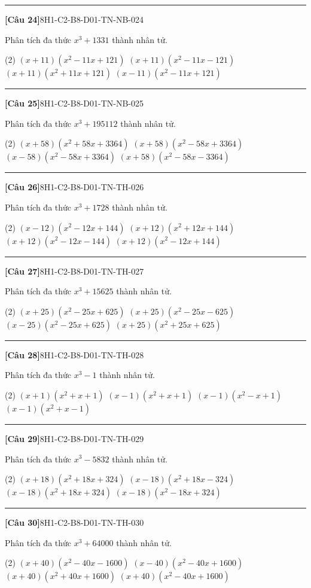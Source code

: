 \documentclass[12pt,a4paper]{article}
\newif\ifloigiai
\newenvironment{cauhoi}[2]{%
  \par\medskip\noindent\rule{\textwidth}{0.4pt}\par\nopagebreak
  \noindent\textbf{[#1]}\hfill{\scriptsize\ttfamily #2}\par\nopagebreak\smallskip}{\par}
\newcommand{\dapan}[1]{\ifloigiai\par\smallskip\noindent\textit{Đáp án:} \textbf{#1}\par\fi}
\begin{document}
\begin{cauhoi}{Câu 24}{8H1-C2-B8-D01-TN-NB-024}
Phân tích đa thức $x^{3}+1331$ thành nhân tử.
\begin{tasks}(2)
\task $(x+11)(x^{2}-11x+121)$
\task $(x+11)(x^{2}-11x-121)$
\task $(x+11)(x^{2}+11x+121)$
\task $(x-11)(x^{2}-11x+121)$
\end{tasks}
\dapan{A}
\end{cauhoi}
\begin{cauhoi}{Câu 25}{8H1-C2-B8-D01-TN-NB-025}
Phân tích đa thức $x^{3}+195112$ thành nhân tử.
\begin{tasks}(2)
\task $(x+58)(x^{2}+58x+3364)$
\task $(x+58)(x^{2}-58x+3364)$
\task $(x-58)(x^{2}-58x+3364)$
\task $(x+58)(x^{2}-58x-3364)$
\end{tasks}
\dapan{B}
\end{cauhoi}
\begin{cauhoi}{Câu 26}{8H1-C2-B8-D01-TN-TH-026}
Phân tích đa thức $x^{3}+1728$ thành nhân tử.
\begin{tasks}(2)
\task $(x-12)(x^{2}-12x+144)$
\task $(x+12)(x^{2}+12x+144)$
\task $(x+12)(x^{2}-12x-144)$
\task $(x+12)(x^{2}-12x+144)$
\end{tasks}
\dapan{D}
\end{cauhoi}
\begin{cauhoi}{Câu 27}{8H1-C2-B8-D01-TN-TH-027}
Phân tích đa thức $x^{3}+15625$ thành nhân tử.
\begin{tasks}(2)
\task $(x+25)(x^{2}-25x+625)$
\task $(x+25)(x^{2}-25x-625)$
\task $(x-25)(x^{2}-25x+625)$
\task $(x+25)(x^{2}+25x+625)$
\end{tasks}
\dapan{A}
\end{cauhoi}
\begin{cauhoi}{Câu 28}{8H1-C2-B8-D01-TN-TH-028}
Phân tích đa thức $x^{3}-1$ thành nhân tử.
\begin{tasks}(2)
\task $(x+1)(x^{2}+x+1)$
\task $(x-1)(x^{2}+x+1)$
\task $(x-1)(x^{2}-x+1)$
\task $(x-1)(x^{2}+x-1)$
\end{tasks}
\dapan{B}
\end{cauhoi}
\begin{cauhoi}{Câu 29}{8H1-C2-B8-D01-TN-TH-029}
Phân tích đa thức $x^{3}-5832$ thành nhân tử.
\begin{tasks}(2)
\task $(x+18)(x^{2}+18x+324)$
\task $(x-18)(x^{2}+18x-324)$
\task $(x-18)(x^{2}+18x+324)$
\task $(x-18)(x^{2}-18x+324)$
\end{tasks}
\dapan{C}
\end{cauhoi}
\begin{cauhoi}{Câu 30}{8H1-C2-B8-D01-TN-TH-030}
Phân tích đa thức $x^{3}+64000$ thành nhân tử.
\begin{tasks}(2)
\task $(x+40)(x^{2}-40x-1600)$
\task $(x-40)(x^{2}-40x+1600)$
\task $(x+40)(x^{2}+40x+1600)$
\task $(x+40)(x^{2}-40x+1600)$
\end{tasks}
\dapan{D}
\end{cauhoi}
\end{document}
